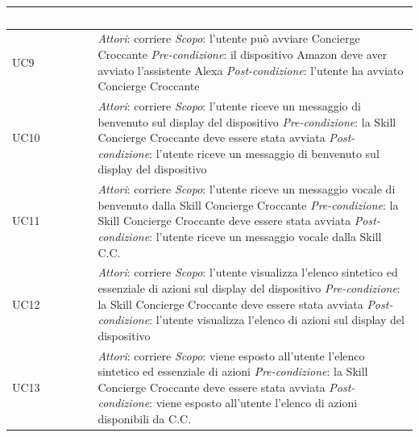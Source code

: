 \begin{center}
	\centering
	\renewcommand{\arraystretch}{1.5}
	\begin{longtable}{  p{2.5cm} p{9.8cm} }
		\rowcolor{tableHead}
		\textbf{\textcolor{white}{Identificativo}} & \textbf{\textcolor{white}{Descrizione}} \\
		\endhead  
		
		
		UC9 &  \textit{Attori}: corriere \newline \textit{Scopo}: l'utente può avviare Concierge Croccante \newline \textit{Pre-condizione}: il dispositivo Amazon deve aver avviato l'assistente Alexa \newline \textit{Post-condizione}: l'utente ha avviato Concierge Croccante \\
		
		UC10 &  \textit{Attori}: corriere \newline \textit{Scopo}: l'utente riceve un messaggio di benvenuto sul display del dispositivo \newline \textit{Pre-condizione}: la Skill Concierge Croccante deve essere stata avviata \newline \textit{Post-condizione}: l'utente riceve un messaggio di benvenuto sul display del dispositivo \\
		
		UC11 &  \textit{Attori}: corriere \newline \textit{Scopo}: l'utente riceve un messaggio vocale di benvenuto dalla Skill \mbox{Concierge} Croccante \newline \textit{Pre-condizione}: la Skill Concierge Croccante deve essere stata avviata \newline \textit{Post-condizione}: l'utente riceve un messaggio vocale dalla Skill C.C.\\
		
		UC12 &  \textit{Attori}: corriere \newline \textit{Scopo}: l'utente visualizza l'elenco sintetico ed essenziale di azioni sul \mbox{display} del dispositivo \newline \textit{Pre-condizione}: la Skill Concierge Croccante deve essere stata avviata \newline \textit{Post-condizione}: l'utente visualizza l'elenco di azioni sul display del dispositivo \\
		
		UC13 &  \textit{Attori}: corriere \newline \textit{Scopo}: viene esposto all'utente l'elenco sintetico ed essenziale di azioni \newline \textit{Pre-condizione}: la Skill Concierge Croccante deve essere stata avviata \newline \textit{Post-condizione}: viene esposto all'utente l'elenco di azioni disponibili da C.C. \\
		

\end{longtable}
\end{center}
